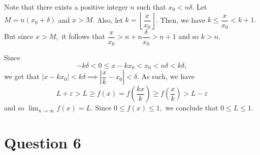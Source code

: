 \documentclass{article}
\begin{document}
\begin{enumerate}[(a)]
    Note that there exists a positive integer $n$ such that $x_0<n\delta.$ Let $M=n(x_0+\delta)$ and $x>M.$ Also, let $k=\left\lfloor\dfrac{x}{x_0}\right\rfloor.$ Then, we have $k\leq \dfrac{x}{x_0}<k+1.$ But since $x>M,$ it follows that $\dfrac{x}{x_0}>n+n\dfrac{\delta}{x_0}>n+1$ and so $k>n.$
    
    Since $$-k\delta<0\leq x-kx_0<x_0<n\delta<k\delta,$$
    we get that $|x-kx_0|<k\delta\implies \left|\dfrac{x}{k}-x_0\right|<\delta.$ As such, we have $$L+\varepsilon>L\geq f(x)=f\left(\frac{kx}{k}\right)\geq f\left(\frac{x}{k}\right)>L-\varepsilon$$ and so $\displaystyle\lim_{n\to\infty}f(x)=L.$ Since $0\leq f(x)\leq 1,$ we conclude that $0\leq L\leq 1.$
\end{enumerate}
\section*{Question 6}
\end{document}
